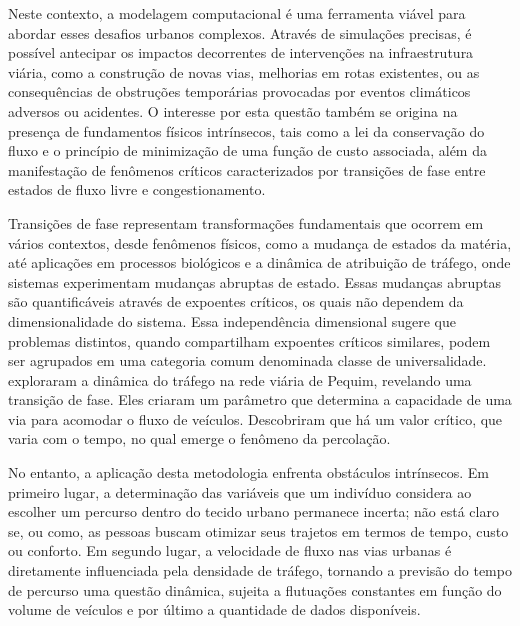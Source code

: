 \documentclass{article}
\begin{document}

Neste contexto, a modelagem computacional é uma ferramenta viável para abordar esses desafios urbanos complexos. Através de simulações precisas, é possível antecipar os impactos decorrentes de intervenções na infraestrutura viária, como a construção de novas vias, melhorias em rotas existentes, ou as consequências de obstruções temporárias provocadas por eventos climáticos adversos ou acidentes. O interesse por esta questão também se origina na presença de fundamentos físicos intrínsecos, tais como a lei da conservação do fluxo e o princípio de minimização de uma função de custo associada, além da manifestação de fenômenos críticos caracterizados por transições de fase entre estados de fluxo livre e congestionamento. 


Transições de fase representam transformações fundamentais que ocorrem em vários contextos, desde fenômenos físicos, como a mudança de estados da matéria, até aplicações em processos biológicos e a dinâmica de atribuição de tráfego, onde sistemas experimentam mudanças abruptas de estado. Essas mudanças abruptas são quantificáveis através de expoentes críticos, os quais não dependem da dimensionalidade do sistema. Essa independência dimensional sugere que problemas distintos, quando compartilham expoentes críticos similares, podem ser agrupados em uma categoria comum denominada classe de universalidade. 
\citet{Li2014,Zeng2018} exploraram a dinâmica do tráfego na rede viária de Pequim, revelando uma transição de fase. Eles criaram um parâmetro que determina a capacidade de uma via para acomodar o fluxo de veículos. Descobriram que há um valor crítico, que varia com o tempo, no qual emerge o fenômeno da percolação.

No entanto, a aplicação desta metodologia enfrenta obstáculos intrínsecos. Em primeiro lugar, a determinação das variáveis que um indivíduo considera ao escolher um percurso dentro do tecido urbano permanece incerta; não está claro se, ou como, as pessoas buscam otimizar seus trajetos em termos de tempo, custo ou conforto. Em segundo lugar, a velocidade de fluxo nas vias urbanas é diretamente influenciada pela densidade de tráfego, tornando a previsão do tempo de percurso uma questão dinâmica, sujeita a flutuações constantes em função do volume de veículos e por último a quantidade de dados disponíveis.

\end{document}
